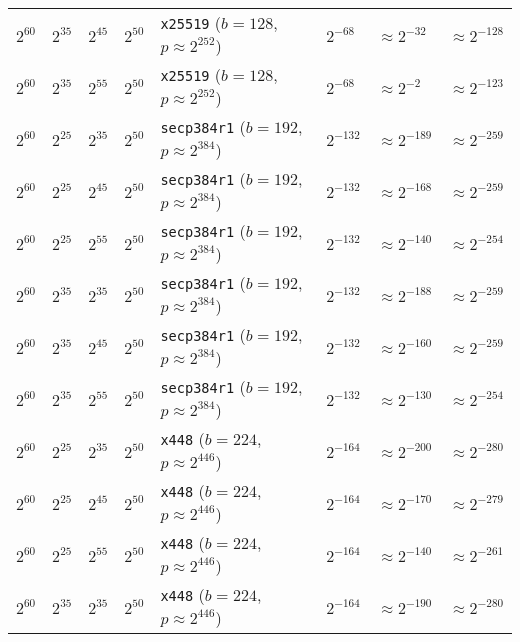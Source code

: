 \begin{table}[p]
{\begin{tabular}{@{}llllllll@{}}
$2^{60}$	&$2^{35}$	&$2^{45}$	&$2^{50}$	&\texttt{x25519} ($b \!=\! 128$, \! $p \!\approx\! 2^{252}$)	&$2^{-68}$	&$\approx 2^{-32}$	& \cellcolor{green!25}$\approx 2^{-128}$	\\
$2^{60}$	&$2^{35}$	&$2^{55}$	&$2^{50}$	&\texttt{x25519} ($b \!=\! 128$, \! $p \!\approx\! 2^{252}$)	&$2^{-68}$	&$\approx 2^{-2}$	& \cellcolor{green!25}$\approx 2^{-123}$	\\
\midrule
$2^{60}$	&$2^{25}$	&$2^{35}$	&$2^{50}$	&\texttt{secp384r1} ($b \!=\! 192$, \! $p \!\approx\! 2^{384}$)	&$2^{-132}$	&\cellcolor{green!25}$\approx 2^{-189}$	&\cellcolor{green!25}$\approx 2^{-259}$	\\
$2^{60}$	&$2^{25}$	&$2^{45}$	&$2^{50}$	&\texttt{secp384r1} ($b \!=\! 192$, \! $p \!\approx\! 2^{384}$)	&$2^{-132}$	&\cellcolor{green!25}$\approx 2^{-168}$	&\cellcolor{green!25}$\approx 2^{-259}$	\\
$2^{60}$	&$2^{25}$	&$2^{55}$	&$2^{50}$	&\texttt{secp384r1} ($b \!=\! 192$, \! $p \!\approx\! 2^{384}$)	&$2^{-132}$	&\cellcolor{green!25}$\approx 2^{-140}$	&\cellcolor{green!25}$\approx 2^{-254}$	\\
$2^{60}$	&$2^{35}$	&$2^{35}$	&$2^{50}$	&\texttt{secp384r1} ($b \!=\! 192$, \! $p \!\approx\! 2^{384}$)	&$2^{-132}$	&\cellcolor{green!25}$\approx 2^{-188}$	&\cellcolor{green!25}$\approx 2^{-259}$	\\
$2^{60}$	&$2^{35}$	&$2^{45}$	&$2^{50}$	&\texttt{secp384r1} ($b \!=\! 192$, \! $p \!\approx\! 2^{384}$)	&$2^{-132}$	&\cellcolor{green!25}$\approx 2^{-160}$	&\cellcolor{green!25}$\approx 2^{-259}$	\\
$2^{60}$	&$2^{35}$	&$2^{55}$	&$2^{50}$	&\texttt{secp384r1} ($b \!=\! 192$, \! $p \!\approx\! 2^{384}$)	&$2^{-132}$	&$\approx 2^{-130}$	& \cellcolor{green!25}$\approx 2^{-254}$	\\
\midrule
$2^{60}$	&$2^{25}$	&$2^{35}$	&$2^{50}$	&\texttt{x448} ($b \!=\! 224$, \! $p \!\approx\! 2^{446}$)	&$2^{-164}$	&\cellcolor{green!25}$\approx 2^{-200}$	&\cellcolor{green!25}$\approx 2^{-280}$	\\
$2^{60}$	&$2^{25}$	&$2^{45}$	&$2^{50}$	&\texttt{x448} ($b \!=\! 224$, \! $p \!\approx\! 2^{446}$)	&$2^{-164}$	&\cellcolor{green!25}$\approx 2^{-170}$	&\cellcolor{green!25}$\approx 2^{-279}$	\\
$2^{60}$	&$2^{25}$	&$2^{55}$	&$2^{50}$	&\texttt{x448} ($b \!=\! 224$, \! $p \!\approx\! 2^{446}$)	&$2^{-164}$	&$\approx 2^{-140}$	& \cellcolor{green!25}$\approx 2^{-261}$	\\
$2^{60}$	&$2^{35}$	&$2^{35}$	&$2^{50}$	&\texttt{x448} ($b \!=\! 224$, \! $p \!\approx\! 2^{446}$)	&$2^{-164}$	&\cellcolor{green!25}$\approx 2^{-190}$	&\cellcolor{green!25}$\approx 2^{-280}$	\\

\end{tabular}}
\end{table}
